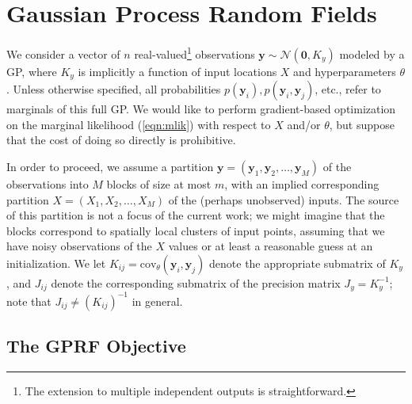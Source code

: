 \documentclass{article}
\newcommand{\N}{\mathcal{N}}
\newcommand{\cov}{\text{cov}}
\renewcommand{\v}[1]{\mathbf{#1}}
\begin{document}
\section{Gaussian Process Random Fields}
\label{sec:gprf}

We consider a vector of $n$ real-valued\footnote{The extension to
  multiple independent outputs is straightforward.} observations
$\v{y} \sim \N(\v{0}, K_y)$ modeled by a GP, where $K_y$ is implicitly
a function of input locations $X$ and hyperparameters $\theta$. Unless
otherwise specified, all probabilities $p(\v{y}_i), p(\v{y}_i,
\v{y}_j)$, etc., refer to marginals of this full GP. We would like to
perform gradient-based optimization on the marginal likelihood
(\ref{eqn:mlik}) with respect to $X$ and/or $\theta$, but suppose that
the cost of doing so directly is prohibitive.

In order to proceed, we assume a partition $\v{y} = (\v{y}_1, \v{y}_2,
\ldots, \v{y}_M)$ of the observations into $M$ blocks of size at most
$m$, with an implied corresponding partition $X = (X_1, X_2, \ldots,
X_M)$ of the (perhaps unobserved) inputs. The source of this partition
is not a focus of the current work; we might imagine that the blocks
correspond to spatially local clusters of input points, assuming that
we have noisy observations of the $X$ values or at least a reasonable
guess at an initialization. We let $K_{ij} = \cov_\theta(\v{y}_i,
\v{y}_j)$ denote the appropriate submatrix of $K_{y}$, and $J_{ij}$
denote the corresponding submatrix of the precision matrix
$J_y=K_y^{-1}$; note that $J_{ij} \ne (K_{ij})^{-1}$ in general.

\subsection{The GPRF Objective}
\end{document}
